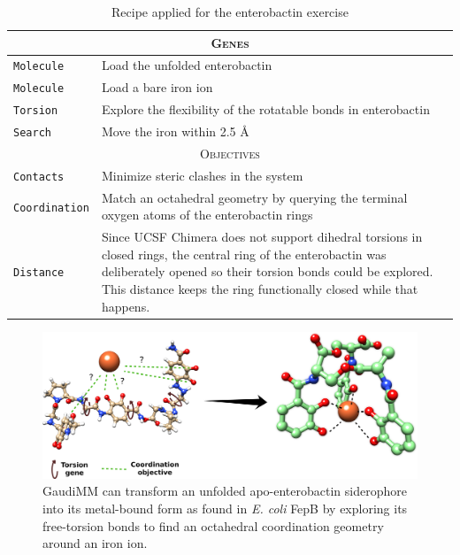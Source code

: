 \begin{table}[hbtp]
	\caption{Recipe applied for the enterobactin exercise}
	\label{table:siderophore}
	\footnotesize
	\newcommand{\tableheading}[1]{\multicolumn{2}{c}{\textsc{#1}}}
	\begin{tabularx}{\textwidth}{RL}
		\toprule
		\tableheading{Genes}\\
		\toprule
		\texttt{Molecule} & Load the unfolded enterobactin\cite{Enterobactin} \\
		\midrule
		\texttt{Molecule} & Load a bare iron ion \\
		\midrule
		\texttt{Torsion} & Explore the flexibility of the rotatable bonds in enterobactin \\
		\midrule
		\texttt{Search} & Move the iron within 2.5 \AA \\
		\toprule
		\tableheading{Objectives}\\
		\toprule
		\texttt{Contacts} & Minimize steric clashes in the system \\
		\midrule
		\texttt{Coordination} & Match an octahedral geometry by querying the terminal oxygen atoms of the enterobactin rings \\
		\midrule
		\texttt{Distance} & Since UCSF Chimera does not support dihedral torsions in closed rings, the central ring of the enterobactin was deliberately opened so their torsion bonds could be explored. This distance keeps the ring functionally closed while that happens. \\
		\bottomrule
	\end{tabularx}
\end{table}


\begin{figure}[H] %
	\begin{Center}
		\includegraphics[width=\textwidth]{./figures/06/siderophore.png}
	\end{Center}
	\cprotect\caption[Siderophore folding]{GaudiMM can transform an unfolded apo-enterobactin siderophore into its metal-bound form as found in \textit{E. coli} FepB by exploring its free-torsion bonds to find an octahedral coordination geometry around an iron ion.}
	\label{fig:siderophore}
\end{figure}


